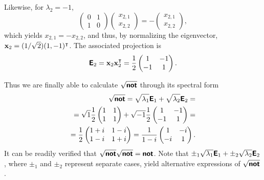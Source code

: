 {Likewise, for $\lambda_2=-1$,
\begin{equation}
\begin{pmatrix}
 0&1\\  1&0
\end{pmatrix}
\begin{pmatrix}
x_{2,1}\\x_{2,2}
\end{pmatrix}
=-\begin{pmatrix}
x_{2,1}\\x_{2,2}
\end{pmatrix}
,
\end{equation}
which yields  $x_{2,1}=-x_{2,2}$, and thus, by normalizing the eigenvector,
${\bf x}_2=(1/\sqrt{2})(1,-1)^\intercal $.
The associated projection is
\begin{equation}
\textsf{\textbf{E}}_2={\bf x}_2{\bf x}_2^\intercal =\frac{1}{2}
\begin{pmatrix}
 1&-1\\  -1&1
\end{pmatrix}
.
\end{equation}

Thus we are finally able to calculate
$\sqrt{\textsf{\textbf{not}}}$
through its spectral form
\begin{equation}
\begin{split}
\sqrt{\textsf{\textbf{not}}}=
\sqrt{\lambda_1}\textsf{\textbf{E}}_1 +
\sqrt{\lambda_2}\textsf{\textbf{E}}_2
=
\\=  \sqrt{1}
\frac{1}{2} \begin{pmatrix}
 1&1\\  1&1
\end{pmatrix}
+  \sqrt{-1}
\frac{1}{2} \begin{pmatrix}
 1&-1\\  -1&1
\end{pmatrix}
=
\\
=
\frac{1}{2}
\begin{pmatrix}
 1+i&1-i\\  1-i&1+i
\end{pmatrix}
=
\frac{1}{1-i}
\begin{pmatrix}
 1&-i\\  -i&1
\end{pmatrix}
.
\end{split}
\end{equation}
It can be readily verified that  $\sqrt{\textsf{\textbf{not}}}\sqrt{\textsf{\textbf{not}}}=\textsf{\textbf{not}}$.
Note that
$\pm_1 \sqrt{\lambda_1}\textsf{\textbf{E}}_1 +
\pm_2 \sqrt{\lambda_2}\textsf{\textbf{E}}_2$, where $\pm_1$ and $\pm_2$ represent separate cases,
yield alternative expressions of $\sqrt{\textsf{\textbf{not}}}$.



\eexample
}


